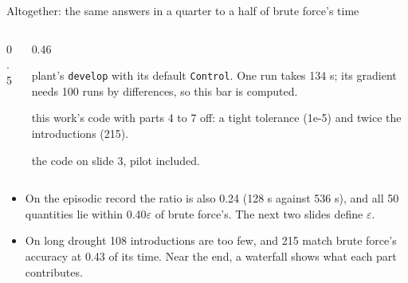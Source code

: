 \documentclass[aspectratio=169,10pt]{beamer}
\begin{document}
\begin{frame}{Altogether: the same answers in a quarter to a half of brute force's time}
  \begin{columns}[T]
    \begin{column}{0.5\textwidth}
    \end{column}
    \begin{column}{0.46\textwidth}
      \footnotesize
      \begin{description}
        \item[develop] plant's \texttt{develop} with its default \texttt{Control}. One run takes
          134 s; its gradient needs 100 runs by differences, so this bar is computed.
        \item[brute force] this work's code with parts 4 to 7 off: a tight tolerance (1e-5) and
          twice the introductions (215).
        \item[this work] the code on slide 3, pilot included.
      \end{description}
    \end{column}
  \end{columns}
  \medskip
  \small
  \begin{itemize}
    \item On the episodic record the ratio is also 0.24 (128 s against 536 s), and all 50 quantities
      lie within 0.40$\varepsilon$ of brute force's. The next two slides define $\varepsilon$.
    \item On long drought 108 introductions are too few, and 215 match brute force's accuracy
      at 0.43 of its time. Near the end, a waterfall shows what each part contributes.
  \end{itemize}
\end{frame}
\end{document}
